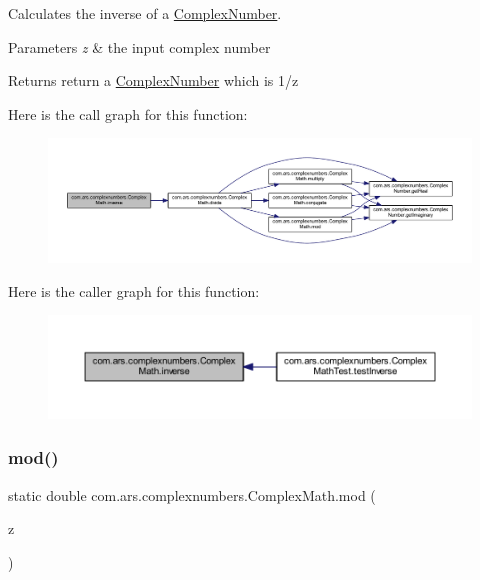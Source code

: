Calculates the inverse of a {\ttfamily \hyperlink{classcom_1_1ars_1_1complexnumbers_1_1_complex_number}{Complex\+Number}}. 
\begin{DoxyParams}{Parameters}
{\em z} & the input complex number \\
\hline
\end{DoxyParams}
\begin{DoxyReturn}{Returns}
return a {\ttfamily \hyperlink{classcom_1_1ars_1_1complexnumbers_1_1_complex_number}{Complex\+Number}} which is 1/z 
\end{DoxyReturn}
Here is the call graph for this function\+:
\nopagebreak
\begin{figure}[H]
\begin{center}
\leavevmode
\includegraphics[width=350pt]{classcom_1_1ars_1_1complexnumbers_1_1_complex_math_a06897e69e7c59bf707851f4a502d11b8_cgraph}
\end{center}
\end{figure}
Here is the caller graph for this function\+:
\nopagebreak
\begin{figure}[H]
\begin{center}
\leavevmode
\includegraphics[width=350pt]{classcom_1_1ars_1_1complexnumbers_1_1_complex_math_a06897e69e7c59bf707851f4a502d11b8_icgraph}
\end{center}
\end{figure}
\hypertarget{classcom_1_1ars_1_1complexnumbers_1_1_complex_math_a1ffa4f4678b201779a1ac8212fc93e05}{}\label{classcom_1_1ars_1_1complexnumbers_1_1_complex_math_a1ffa4f4678b201779a1ac8212fc93e05} 
\subsubsection{\texorpdfstring{mod()}{mod()}}
{\footnotesize\ttfamily static double com.\+ars.\+complexnumbers.\+Complex\+Math.\+mod (\begin{DoxyParamCaption}\item[{\hyperlink{classcom_1_1ars_1_1complexnumbers_1_1_complex_number}{Complex\+Number}}]{z }\end{DoxyParamCaption})\hspace{0.3cm}{\ttfamily [static]}}

